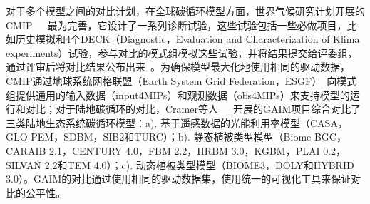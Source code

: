 
对于多个模型之间的对比计划，在全球碳循环模型方面，世界气候研究计划开展的CMIP~\cite{meehl2000coupled}~\cite{Taylor2012An}~\cite{eyring2016overview}最为完善，它设计了一系列诊断试验，这些试验包括一些必做项目，比如历史模拟和4个DECK（Diagnostic，Evaluation and Characterization of Klima experiments）试验，参与对比的模式组模拟这些试验，并将结果提交给评委组，通过评审后将对比结果公布出来~\cite{赵宗慈2016CMIP6}。为确保模型最大化地使用相同的驱动数据，CMIP通过地球系统网格联盟（Earth System Grid Federation，ESGF）~\cite{williams2011earth}向模式组提供通用的输入数据（input4MIPs）和观测数据（obs4MIPs）来支持模型的运行和对比；对于陆地碳循环的对比，Cramer等人~\cite{cramer1999comparing}~\cite{kicklighter1999comparing}~\cite{bondeau1999comparing}开展的GAIM项目综合对比了三类陆地生态系统碳循环模型：a). 基于遥感数据的光能利用率模型（CASA，GLO-PEM，SDBM，SIB2和TURC）；b). 静态植被类型模型（Biome-BGC，CARAIB 2.1，CENTURY 4.0，FBM 2.2，HRBM 3.0，KGBM，PLAI 0.2，SILVAN 2.2和TEM 4.0）；c). 动态植被类型模型（BIOME3，DOLY和HYBRID 3.0）。GAIM的对比通过使用相同的驱动数据集，使用统一的可视化工具来保证对比的公平性。





